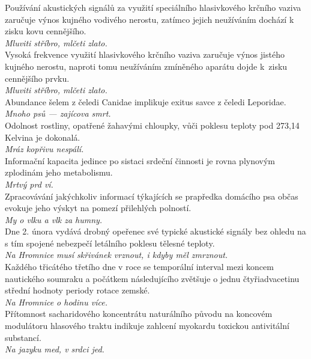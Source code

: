 \begin{multicols}{\value{columnsgames}}
\noindent
Používání akustických signálů za využití speciálního hlasivkového
krčního vaziva zaručuje výnos kujného vodivého nerostu, zatímco jejich
neužíváním dochází k zisku kovu cennějšího.\\[1 mm]
{\sl Mluviti stříbro, mlčeti zlato.}\\

\noindent
Vysoká frekvence využití hlasivkového krčního vaziva zaručuje
výnos jistého kujného nerostu, naproti tomu neužíváním zmíněného
aparátu dojde k~zisku cennějšího prvku.\\[1 mm]
{\sl Mluviti stříbro, mlčeti zlato.}\\

\noindent
Abundance šelem z čeledi Canidae implikuje exitus savce z
čeledi Leporidae.\\[1 mm]
{\sl Mnoho psů --- zajícova smrt.}\\

\noindent
Odolnost rostliny, opatřené žahavými chloupky, vůči poklesu
teploty pod 273,14 Kelvina je dokonalá.\\[1 mm]
{\sl Mráz kopřivu nespálí.}\\

\noindent
Informační kapacita jedince po sistaci srdeční činnosti je
rovna plynovým zplodinám jeho metabolismu.\\[1 mm]
{\sl Mrtvý prd ví.}\\

\noindent
Zpracovávání jakýchkoliv informací týkajících se prapředka
domácího psa občas evokuje jeho výskyt na pomezí přilehlých
polností.\\[1 mm]
{\sl My o vlku a vlk za humny.}\\

\noindent
Dne 2. února vydává drobný opeřenec své typické akustické
signály bez ohledu na s tím spojené nebezpečí letálního poklesu
tělesné teploty.\\[1 mm]
{\sl Na Hromnice musí skřivánek vrznout, i kdyby měl zmrznout.}\\

\noindent
Každého třicátého třetího dne v roce se temporální interval
mezi koncem nautického soumraku a počátkem následujícího zvětšuje
o jednu čtyřiadvacetinu střední hodnoty periody rotace zemské.\\[1 mm]
{\sl Na Hromnice o hodinu více.}\\

\noindent
Přítomnost sacharidového koncentrátu naturálního původu na
koncovém modulátoru hlasového traktu indikuje zahlcení myokardu
toxickou antivitální substancí.\\[1 mm]
{\sl Na jazyku med, v srdci jed.}\\


\end{multicols}
